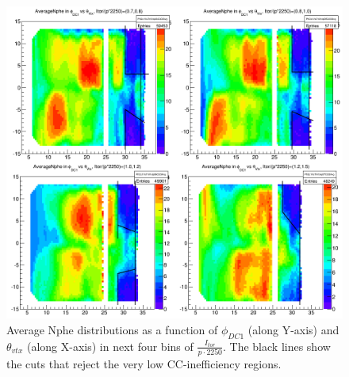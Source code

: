\begin{figure}[H]%
\centering
\leavevmode \includegraphics[width=1.1\textwidth]{figuresEG4/NewP2/FidCuts/moreFiducialCutsMoreInversePBinsEbi2next4Bins.png}
\caption[Fiducial cuts (next 4 bins)]{Average Nphe distributions as a function of $\phi_{DC1}$ (along Y-axis) and $\theta_{vtx}$ (along X-axis) in next four bins of $\frac{I_{tor}}{p \cdot 2250}$. The black lines show the cuts that reject the very low CC-inefficiency regions.}
\label{figFidAvgNph1}
\end{figure}


